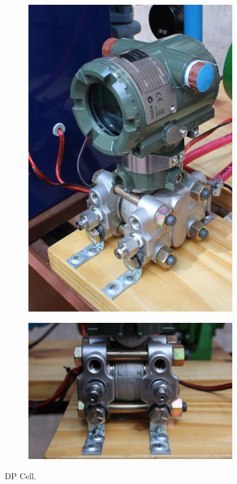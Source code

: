\begin{figure}[ht]
        \centering
        \begin{subfigure}[b]{0.3\textwidth}
\includegraphics[width=\textwidth]
	{Cap2-DisenoEnsamblado/images/dpcell1.JPG}
        \end{subfigure}%
        \hfil
        \begin{subfigure}[b]{0.6\textwidth}
\includegraphics[width=\textwidth]
	{Cap2-DisenoEnsamblado/images/dpcell2.JPG}
        \end{subfigure}
        \caption{DP Cell.}
        \label{fig:dpcelfig}
\end{figure}

